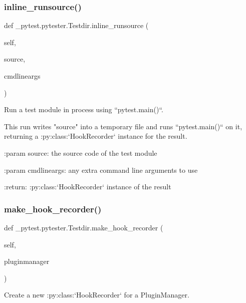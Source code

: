 \subsubsection{\texorpdfstring{inline\+\_\+runsource()}{inline\_runsource()}}
{\footnotesize\ttfamily def \+\_\+pytest.\+pytester.\+Testdir.\+inline\+\_\+runsource (\begin{DoxyParamCaption}\item[{}]{self,  }\item[{}]{source,  }\item[{}]{cmdlineargs }\end{DoxyParamCaption})}

\begin{DoxyVerb}Run a test module in process using ``pytest.main()``.

This run writes "source" into a temporary file and runs
``pytest.main()`` on it, returning a :py:class:`HookRecorder` instance
for the result.

:param source: the source code of the test module

:param cmdlineargs: any extra command line arguments to use

:return: :py:class:`HookRecorder` instance of the result\end{DoxyVerb}
 \mbox{\label{class__pytest_1_1pytester_1_1_testdir_a3cd564d773658c4b44e8edf2bcd1a92b}} 
\subsubsection{\texorpdfstring{make\+\_\+hook\+\_\+recorder()}{make\_hook\_recorder()}}
{\footnotesize\ttfamily def \+\_\+pytest.\+pytester.\+Testdir.\+make\+\_\+hook\+\_\+recorder (\begin{DoxyParamCaption}\item[{}]{self,  }\item[{}]{pluginmanager }\end{DoxyParamCaption})}

\begin{DoxyVerb}Create a new :py:class:`HookRecorder` for a PluginManager.\end{DoxyVerb}
 \mbox{\label{class__pytest_1_1pytester_1_1_testdir_a99f7e222aba80cb2c8fc8b67d0b9a980}} 
